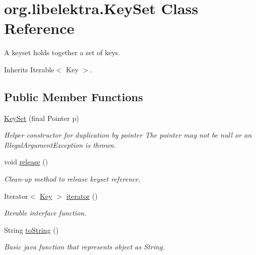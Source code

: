 \hypertarget{classorg_1_1libelektra_1_1KeySet}{}\section{org.\+libelektra.\+Key\+Set Class Reference}
\label{classorg_1_1libelektra_1_1KeySet}


A keyset holds together a set of keys.  




Inherits Iterable$<$ Key $>$.

\subsection*{Public Member Functions}
\begin{DoxyCompactItemize}
\item 
\mbox{\hyperlink{classorg_1_1libelektra_1_1KeySet_adf4ea02b31ed468e49c615f61ea57a15}{Key\+Set}} (final Pointer p)
\begin{DoxyCompactList}\small\item\em Helper constructor for duplication by pointer The pointer may not be null or an Illegal\+Argument\+Exception is thrown. \end{DoxyCompactList}\item 
\mbox{\label{classorg_1_1libelektra_1_1KeySet_aa3851e13c627e32f02275636806e30cc}} 
void \mbox{\hyperlink{classorg_1_1libelektra_1_1KeySet_aa3851e13c627e32f02275636806e30cc}{release}} ()
\begin{DoxyCompactList}\small\item\em Clean-\/up method to release keyset reference. \end{DoxyCompactList}\item 
Iterator$<$ \mbox{\hyperlink{classorg_1_1libelektra_1_1Key}{Key}} $>$ \mbox{\hyperlink{classorg_1_1libelektra_1_1KeySet_a1a3b37dff55df600c4fee6bea714a8d9}{iterator}} ()
\begin{DoxyCompactList}\small\item\em Iterable interface function. \end{DoxyCompactList}\item 
String \mbox{\hyperlink{classorg_1_1libelektra_1_1KeySet_a9c1e2918acce8c7cda5be406989c87af}{to\+String}} ()
\begin{DoxyCompactList}\small\item\em Basic java function that represents object as String. \end{DoxyCompactList}\item 

\end{DoxyCompactItemize}
